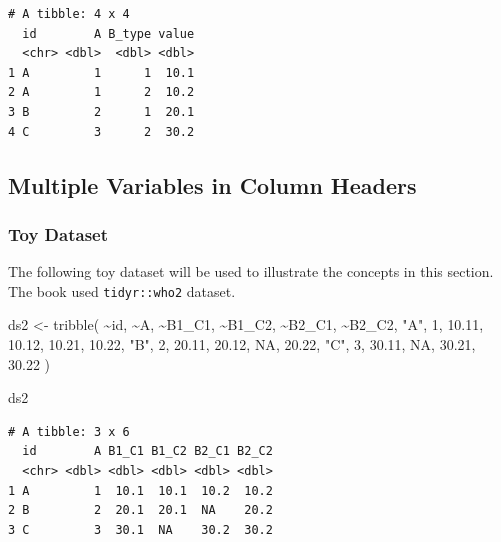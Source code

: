 \documentclass[
  letterpaper,
  DIV=11,
  numbers=noendperiod]{scrreprt}
\newenvironment{Shaded}{\begin{snugshade}}{\end{snugshade}}
\newcommand{\ConstantTok}[1]{\textcolor[rgb]{0.56,0.35,0.01}{#1}}
\newcommand{\DecValTok}[1]{\textcolor[rgb]{0.68,0.00,0.00}{#1}}
\newcommand{\FloatTok}[1]{\textcolor[rgb]{0.68,0.00,0.00}{#1}}
\newcommand{\FunctionTok}[1]{\textcolor[rgb]{0.28,0.35,0.67}{#1}}
\newcommand{\NormalTok}[1]{\textcolor[rgb]{0.00,0.23,0.31}{#1}}
\newcommand{\OtherTok}[1]{\textcolor[rgb]{0.00,0.23,0.31}{#1}}
\newcommand{\SpecialCharTok}[1]{\textcolor[rgb]{0.37,0.37,0.37}{#1}}
\newcommand{\StringTok}[1]{\textcolor[rgb]{0.13,0.47,0.30}{#1}}
\begin{document}
\begin{verbatim}
# A tibble: 4 x 4
  id        A B_type value
  <chr> <dbl>  <dbl> <dbl>
1 A         1      1  10.1
2 A         1      2  10.2
3 B         2      1  20.1
4 C         3      2  30.2
\end{verbatim}

\subsection{Multiple Variables in Column
Headers}\label{multiple-variables-in-column-headers}

\subsubsection{Toy Dataset}\label{toy-dataset-1}

The following toy dataset will be used to illustrate the concepts in
this section. The book used \texttt{tidyr::who2} dataset.

\begin{Shaded}
\begin{Highlighting}[]
\NormalTok{ds2 }\OtherTok{\textless{}{-}} \FunctionTok{tribble}\NormalTok{(}
  \SpecialCharTok{\textasciitilde{}}\NormalTok{id, }\SpecialCharTok{\textasciitilde{}}\NormalTok{A, }\SpecialCharTok{\textasciitilde{}}\NormalTok{B1\_C1, }\SpecialCharTok{\textasciitilde{}}\NormalTok{B1\_C2, }\SpecialCharTok{\textasciitilde{}}\NormalTok{B2\_C1, }\SpecialCharTok{\textasciitilde{}}\NormalTok{B2\_C2,}
  \StringTok{"A"}\NormalTok{, }\DecValTok{1}\NormalTok{, }\FloatTok{10.11}\NormalTok{, }\FloatTok{10.12}\NormalTok{, }\FloatTok{10.21}\NormalTok{, }\FloatTok{10.22}\NormalTok{,}
  \StringTok{"B"}\NormalTok{, }\DecValTok{2}\NormalTok{, }\FloatTok{20.11}\NormalTok{, }\FloatTok{20.12}\NormalTok{, }\ConstantTok{NA}\NormalTok{, }\FloatTok{20.22}\NormalTok{,}
  \StringTok{"C"}\NormalTok{, }\DecValTok{3}\NormalTok{, }\FloatTok{30.11}\NormalTok{, }\ConstantTok{NA}\NormalTok{, }\FloatTok{30.21}\NormalTok{, }\FloatTok{30.22}
\NormalTok{)}

\NormalTok{ds2}
\end{Highlighting}
\end{Shaded}

\begin{verbatim}
# A tibble: 3 x 6
  id        A B1_C1 B1_C2 B2_C1 B2_C2
  <chr> <dbl> <dbl> <dbl> <dbl> <dbl>
1 A         1  10.1  10.1  10.2  10.2
2 B         2  20.1  20.1  NA    20.2
3 C         3  30.1  NA    30.2  30.2
\end{verbatim}
\end{document}
